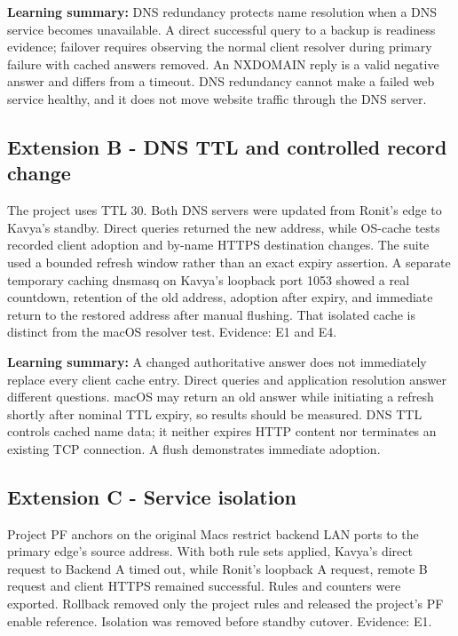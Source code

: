 \documentclass[12pt,a4paper]{article}
\newcommand{\codepath}[1]{\path{#1}}
\begin{document}
\textbf{Learning summary:} DNS redundancy protects name resolution when a DNS service becomes unavailable. A direct successful query to a backup is readiness evidence; failover requires observing the normal client resolver during primary failure with cached answers removed. An NXDOMAIN reply is a valid negative answer and differs from a timeout. DNS redundancy cannot make a failed web service healthy, and it does not move website traffic through the DNS server.


\subsection{Extension B - DNS TTL and controlled record change}


The project uses TTL 30. Both DNS servers were updated from Ronit's edge to Kavya's standby. Direct queries returned the new address, while OS-cache tests recorded client adoption and by-name HTTPS destination changes. The suite used a bounded refresh window rather than an exact expiry assertion. A separate temporary caching dnsmasq on Kavya's loopback port 1053 showed a real countdown, retention of the old address, adoption after expiry, and immediate return to the restored address after manual flushing. That isolated cache is distinct from the macOS resolver test. Evidence: E1 and E4.


\textbf{Learning summary:} A changed authoritative answer does not immediately replace every client cache entry. Direct \codepath{dig @server} queries and application resolution answer different questions. macOS may return an old answer while initiating a refresh shortly after nominal TTL expiry, so results should be measured. DNS TTL controls cached name data; it neither expires HTTP content nor terminates an existing TCP connection. A flush demonstrates immediate adoption.


\subsection{Extension C - Service isolation}


Project PF anchors on the original Macs restrict backend LAN ports to the primary edge's source address. With both rule sets applied, Kavya's direct request to Backend A timed out, while Ronit's loopback A request, remote B request and client HTTPS remained successful. Rules and counters were exported. Rollback removed only the project rules and released the project's PF enable reference. Isolation was removed before standby cutover. Evidence: E1.
\end{document}
